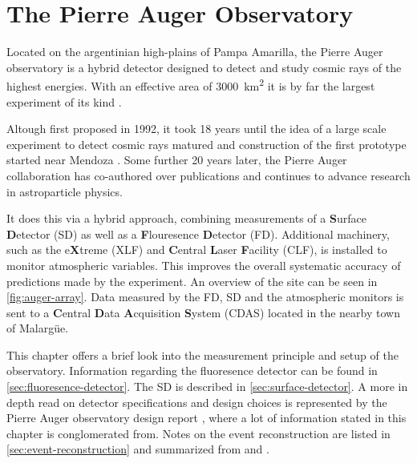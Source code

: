 
\chapter{The Pierre Auger Observatory}
\label{chap:auger-observatory}

Located on the argentinian high-plains of Pampa Amarilla, the Pierre Auger observatory is a hybrid detector designed to detect and study cosmic rays of the highest
energies. With an effective area of \SI{3000}{\kilo\meter\squared} it is by far the largest experiment of its kind \cite{DesignReport}.

Altough first proposed in 1992, it took 18 years until the idea of a large scale experiment to detect cosmic rays matured and construction of the first prototype 
started near Mendoza \cite{AugerTimeline}. Some further 20 years later, the Pierre Auger collaboration has co-authored over \TODO publications and continues to 
advance research in astroparticle physics.

It does this via a hybrid approach, combining measurements of a \textbf{S}urface \textbf{D}etector (SD) as well as a \textbf{F}louresence \textbf{D}etector (FD). 
Additional machinery, such as the e\textbf{X}treme (XLF) and \textbf{C}entral \textbf{L}aser \textbf{F}acility (CLF), is installed to monitor atmospheric 
variables. This improves the overall systematic accuracy of predictions made by the experiment. An overview of the site can be seen in \autoref{fig:auger-array}. 
Data measured by the FD, SD and the atmospheric monitors is sent to a \textbf{C}entral \textbf{D}ata \textbf{A}cquisition \textbf{S}ystem (CDAS) located in the 
nearby town of Malargüe.

This chapter offers a brief look into the measurement principle and setup of the observatory. Information regarding the fluoresence detector can be found in 
\autoref{sec:fluoresence-detector}. The SD is described in \autoref{sec:surface-detector}. A more in depth read on detector specifications and design choices is 
represented by the Pierre Auger observatory design report \cite{DesignReport}, where a lot of information stated in this chapter is conglomerated from. Notes on 
the event reconstruction are listed in \autoref{sec:event-reconstruction} and summarized from \cite{SDReconstruction} and \cite{FDReconstruction}.

